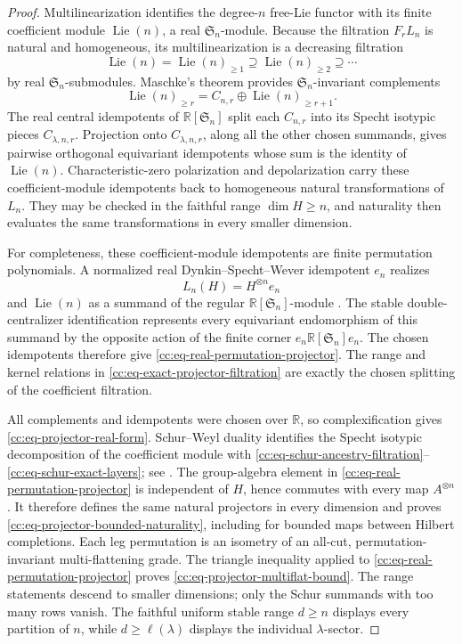 \documentclass[10pt,reqno]{amsart}
\theoremstyle{plain}
\theoremstyle{definition}
\theoremstyle{remark}
\begin{document}
\begin{proof}
Multilinearization identifies the degree-\(n\) free-Lie functor with its
finite coefficient module \(\operatorname{Lie}(n)\), a real
\(\mathfrak S_n\)-module.  Because the filtration \(F_rL_n\) is natural
and homogeneous, its multilinearization is a decreasing filtration
\[
 \operatorname{Lie}(n)=\operatorname{Lie}(n)_{\geq1}
 \supseteq\operatorname{Lie}(n)_{\geq2}
 \supseteq\cdots
\]
by real \(\mathfrak S_n\)-submodules.  Maschke's theorem provides
\(\mathfrak S_n\)-invariant complements
\[
 \operatorname{Lie}(n)_{\geq r}
 =C_{n,r}\oplus\operatorname{Lie}(n)_{\geq r+1}.
\]
The real central idempotents of \(\mathbb R[\mathfrak S_n]\) split each
\(C_{n,r}\) into its Specht isotypic pieces \(C_{\lambda,n,r}\).
Projection onto \(C_{\lambda,n,r}\), along all the other chosen
summands, gives pairwise orthogonal equivariant idempotents whose sum is
the identity of \(\operatorname{Lie}(n)\).
Characteristic-zero polarization and depolarization carry these
coefficient-module idempotents back to homogeneous natural
transformations of \(L_n\).  They may be checked in the faithful range
\(\dim H\geq n\), and naturality then evaluates the same transformations
in every smaller dimension.

For completeness, these coefficient-module idempotents are finite
permutation polynomials.  A normalized real Dynkin--Specht--Wever
idempotent \(e_n\) realizes
\[
 L_n(H)=H^{\otimes n}e_n
\]
and \(\operatorname{Lie}(n)\) as a summand of the regular
\(\mathbb R[\mathfrak S_n]\)-module
\cite[Chs.~0--1]{Reutenauer93}.  The stable double-centralizer
identification represents every equivariant endomorphism of this summand
by the opposite action of the finite corner
\(e_n\mathbb R[\mathfrak S_n]e_n\).  The chosen idempotents therefore
give \eqref{cc:eq-real-permutation-projector}.  The range and kernel
relations in \eqref{cc:eq-exact-projector-filtration} are exactly the
chosen splitting of the coefficient filtration.

All complements and idempotents were chosen over \(\mathbb R\), so
complexification gives \eqref{cc:eq-projector-real-form}.  Schur--Weyl
duality identifies the Specht isotypic decomposition of the coefficient
module with
\eqref{cc:eq-schur-ancestry-filtration}--\eqref{cc:eq-schur-exact-layers};
see \cite[Chs.~4--6]{Fulton97}.  The group-algebra element in
\eqref{cc:eq-real-permutation-projector} is independent of \(H\), hence
commutes with every map \(A^{\otimes n}\).  It therefore defines the same
natural projectors in every dimension and proves
\eqref{cc:eq-projector-bounded-naturality}, including for bounded maps
between Hilbert completions.  Each leg permutation is an isometry of an
all-cut, permutation-invariant multi-flattening grade.  The triangle
inequality applied to \eqref{cc:eq-real-permutation-projector} proves
\eqref{cc:eq-projector-multiflat-bound}.  The range statements descend
to smaller dimensions; only the Schur summands with too many rows
vanish.  The faithful uniform stable range \(d\geq n\) displays every
partition of \(n\), while \(d\geq\ell(\lambda)\) displays the individual
\(\lambda\)-sector.
\end{proof}
\end{document}
